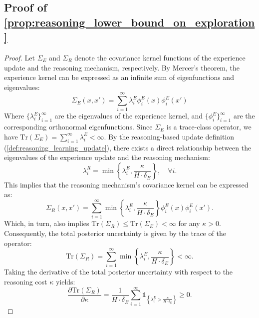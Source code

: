 \subsection{Proof of \ref{prop:reasoning_lower_bound_on_exploration}}
\label{app:proof:reasoning_lower_bound_on_exploration}
\begin{proof}
Let $\Sigma_E$ and $\Sigma_R$ denote the covariance kernel functions of the experience 
update and the reasoning mechanism, respectively. By Mercer's theorem, the experience 
kernel can be expressed as an infinite sum of eigenfunctions and eigenvalues:
\begin{equation}
\Sigma_E(x, x') = \sum_{i=1}^{\infty} \lambda_i^E \phi_i^E(x) \phi_i^E(x')
\end{equation}
Where $\{\lambda_i^E\}_{i=1}^{\infty}$ are the eigenvalues of the experience kernel, and $\{\phi_i^E\}_{i=1}^{\infty}$ are the corresponding orthonormal eigenfunctions. Since $\Sigma_E$ is a trace-class operator, we have $\text{Tr}(\Sigma_E) = \sum_{i=1}^{\infty} \lambda_i^E < \infty$.
By the reasoning-based update definition (\ref{def:reasoning_learning_update}), there 
exists a direct relationship between the eigenvalues of the experience update and 
the reasoning mechanism:
\begin{equation}
\lambda_i^R = \min\left\{\lambda_i^E, \frac{\kappa}{H \cdot \delta_E}\right\}, \quad \forall i.
\end{equation}
This implies that the reasoning mechanism's covariance kernel can be expressed as:
\begin{equation}
\Sigma_R(x, x') = \sum_{i=1}^{\infty} \min\left\{\lambda_i^E, \frac{\kappa}{H \cdot \delta_E}\right\} \phi_i^E(x) \phi_i^E(x').
\end{equation}
Which, in turn, also implies $\text{Tr}(\Sigma_R) \leq \text{Tr}(\Sigma_E) < \infty$ for any $\kappa > 0$.
Consequently, the total posterior uncertainty is given by the trace of the operator:
\begin{equation}
\text{Tr}(\Sigma_R) = \sum_{i=1}^{\infty} \min\left\{\lambda_i^E, \frac{\kappa}{H \cdot \delta_E}\right\} < \infty.
\end{equation}
Taking the derivative of the total posterior uncertainty with respect to the reasoning cost $\kappa$ yields:
\begin{equation}
\frac{\partial \text{Tr}(\Sigma_R)}{\partial \kappa} = \frac{1}{H \cdot \delta_E} \sum_{i=1}^{\infty} \mathbb{1}_{\left\{\lambda_i^E > \frac{\kappa}{H \cdot \delta_E}\right\}} \geq 0.
\end{equation}

\end{proof}
